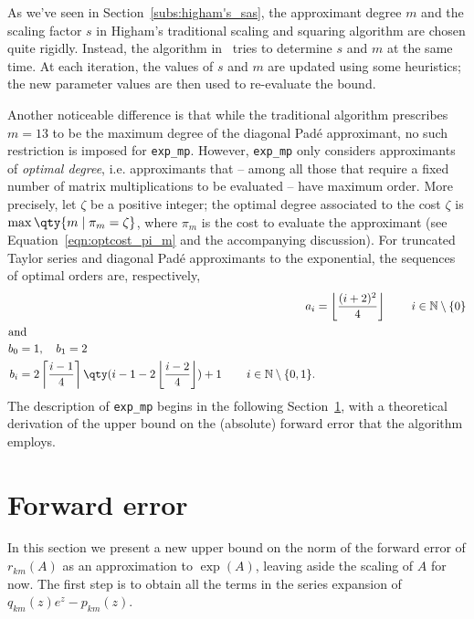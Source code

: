 As we've seen in Section~\ref{subs:higham's_sas}, the approximant degree $m$ and the scaling factor $s$ in Higham's traditional scaling and squaring algorithm are chosen quite rigidly. Instead, the algorithm in~\cite{higham:hf19_mpexpm} tries to determine $s$ and $m$ at the same time. At each iteration, the values of $s$ and $m$ are updated using some heuristics; the new parameter values are then used to re-evaluate the bound. 

Another noticeable difference is that while the traditional algorithm prescribes $m=13$ to be the maximum degree of the diagonal Padé approximant, no such restriction is imposed for \texttt{exp\_mp}. 
However, \texttt{exp\_mp} only considers approximants of \emph{optimal degree}, i.e. approximants that -- among all those that require a fixed number of matrix multiplications to be evaluated -- have maximum order. More precisely, let $\zeta$ be a positive integer; the optimal degree associated to the cost $\zeta$ is $\max\qty{m\mid\pi_m=\zeta}$, where $\pi_m$ is the cost to evaluate the approximant (see Equation~\eqref{eqn:optcost_pi_m} and the accompanying discussion). For truncated Taylor series and diagonal Padé approximants to the exponential, the sequences of optimal orders are, respectively,~\cite[Eqs.~(14) and (25)]{fasi:ps_optimality}
\begin{subequations}\label{eqn:opt_degs_formulas}
	\begin{align}
		a_i &= \left\lfloor\frac{(i+2)^2}{4}\right\rfloor\qquad\,i\in\mathbb{N}\setminus\{0\}\label{eqn:opt_degs_formulas:taylor}\\
	\intertext{and}
		\begin{split}\label{eqn:opt_degs_formulas:pade}
			b_0 &= 1,\quad b_1 = 2\\
			b_i &= 2\left\lceil\frac{i-1}{4}\right\rceil\qty(i-1-2\left\lfloor\frac{i-2}{4}\right\rfloor)+1\qquad\,i\in\mathbb{N}\setminus\{0,1\}.
		\end{split}
	\end{align}
\end{subequations}
The description of \texttt{exp\_mp} begins in  the following Section~\ref{sect:exp_mp_err_bound}, with a theoretical derivation of the upper bound on the (absolute) forward error that the algorithm employs. 

\section{Forward error}\label{sect:exp_mp_err_bound}
In this section we present a new upper bound on the norm of the forward error of $r_{km}(A)$ as an approximation to $\exp(A)$, leaving aside the scaling of $A$ for now. The first step is to obtain all the terms in the series expansion of $q_{km}(z)e^z-p_{km}(z)$.

